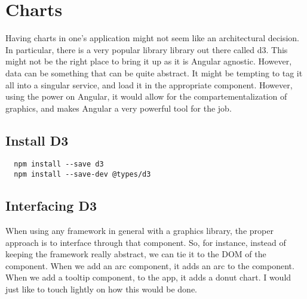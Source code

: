 \maketitle{}
\section{ Charts }

Having charts in one's application might not seem like an architectural
decision. In particular, there is a very popular library library out there
called d3. This might not be the right place to bring it up as it is Angular
agnostic. However, data can be something that can be quite abstract. It might
be tempting to tag it all into a singular service, and load it in the
appropriate component. However, using the power on Angular, it would allow for
the compartementalization of graphics, and makes Angular a very powerful tool
for the job.

\subsection{Install D3}
\begin{verbatim}
  npm install --save d3
  npm install --save-dev @types/d3
\end{verbatim}

\subsection{Interfacing D3}
When using any framework in general with a graphics library, the proper approach
is to interface through that component. So, for instance, instead of keeping
the framework really abstract, we can tie it to the DOM of the component. When
we add an arc component, it adds an arc to the component. When we add a tooltip
component, to the app, it adds a donut chart. I would just like to touch lightly
on how this would be done.
